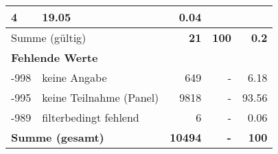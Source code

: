 \begin{longtable}{lXrrr}
       \num{4} &
       \num[round-mode=places,round-precision=2]{19,05} &
         \num[round-mode=places,round-precision=2]{0,04} \\
     \midrule
     \multicolumn{2}{l}{Summe (gültig)} &
       \textbf{\num{21}} &
     \textbf{100} &
       \textbf{\num[round-mode=places,round-precision=2]{0,2}} \\
     \multicolumn{5}{l}{\textbf{Fehlende Werte}}\\
       -998 &
       keine Angabe &
         \num{649} &
        - &
         \num[round-mode=places,round-precision=2]{6,18} \\
       -995 &
       keine Teilnahme (Panel) &
         \num{9818} &
        - &
         \num[round-mode=places,round-precision=2]{93,56} \\
       -989 &
       filterbedingt fehlend &
         \num{6} &
        - &
         \num[round-mode=places,round-precision=2]{0,06} \\
     \midrule
     \multicolumn{2}{l}{\textbf{Summe (gesamt)}} &
          \textbf{\num{10494}} &
        \textbf{-} &
        \textbf{100} \\
     \bottomrule
     \end{longtable}
     
